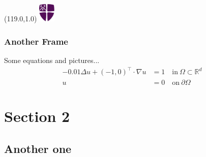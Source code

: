 \documentclass[xcolor=dvipsnames,usepdftitle=false]{beamer}
\newcommand{\MyLogo}{%
	\begin{textblock}{14}(119.0,1.0) %
		\includegraphics[width=0.8cm]{pictures/logo_only.eps}
	\end{textblock}
}
\newcommand{\pO}{{\partial \Omega}}
\begin{document}
\begin{frame}
	\MyLogo
	\frametitle{Another Frame}
	Some equations and pictures...
	\begin{equation} 
		\begin{split}
		-0.01 \Delta u + (-1,0)^\top \cdot \nabla u & = 1  \quad \mathrm{in}~ \Omega \subset \mathbb{R}^d  \nonumber\\
		u & = 0   \quad \mathrm{on}~ \pO \nonumber
		\end{split}
	\end{equation}
	\begin{figure}[htb]
		\setcounter{subfigure}{0}
		\centering
	\end{figure}
\end{frame}

\section{Section 2}

\subsection*{Another one}
\end{document}
